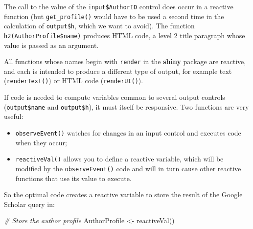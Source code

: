 \documentclass[
  12pt,
  american,
  a4paper,
  extrafontsizes,onecolumn,openright
  ]{memoir}
\newenvironment{Shaded}{\begin{snugshade}}{\end{snugshade}}
\newcommand{\CommentTok}[1]{\textcolor[rgb]{0.56,0.35,0.01}{\textit{#1}}}
\newcommand{\FunctionTok}[1]{\textcolor[rgb]{0.00,0.00,0.00}{#1}}
\newcommand{\NormalTok}[1]{#1}
\newcommand{\OtherTok}[1]{\textcolor[rgb]{0.56,0.35,0.01}{#1}}
\newcommand{\SpecialCharTok}[1]{\textcolor[rgb]{0.00,0.00,0.00}{#1}}
\providecommand{\tightlist}{%
  \setlength{\itemsep}{0pt}\setlength{\parskip}{0pt}}
\begin{document}
\begin{Shaded}
\end{Shaded}

\normalsize

The call to the value of the \texttt{input\$AuthorID} control does occur in a reactive function (but \texttt{get\_profile()} would have to be used a second time in the calculation of \texttt{output\$h}, which we want to avoid).
The function \texttt{h2(AuthorProfile\$name)} produces HTML code, a level 2 title paragraph whose value is passed as an argument.

All functions whose names begin with \texttt{render} in the \textbf{shiny} package are reactive, and each is intended to produce a different type of output, for example text (\texttt{renderText()}) or HTML code (\texttt{renderUI()}).

If code is needed to compute variables common to several output controls (\texttt{output\$name} and \texttt{output\$h}), it must itself be responsive.
Two functions are very useful:

\begin{itemize}
\tightlist
\item
  \texttt{observeEvent()} watches for changes in an input control and executes code when they occur;
\item
  \texttt{reactiveVal()} allows you to define a reactive variable, which will be modified by the \texttt{observeEvent()} code and will in turn cause other reactive functions that use its value to execute.
\end{itemize}

So the optimal code creates a reactive variable to store the result of the Google Scholar query in:

\scriptsize

\begin{Shaded}
\begin{Highlighting}[]
\CommentTok{\# Store the author profile}
\NormalTok{AuthorProfile }\OtherTok{\textless{}{-}} \FunctionTok{reactiveVal}\NormalTok{()}
\end{Highlighting}
\end{Shaded}
\end{document}

